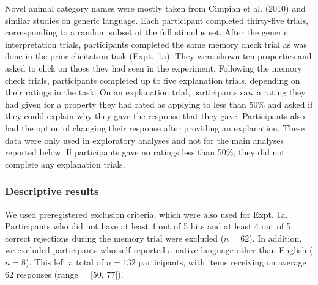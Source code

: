 \documentclass[floatsintext,man]{apa6}
\begin{document}
Novel animal category names were mostly taken from Cimpian et al. (2010) and similar studies on generic language.
Each participant completed thirty-five trials, corresponding to a random subset of the full stimulus set.
After the generic interpretation trials, participants completed the same memory check trial as was done in the prior elicitation task (Expt.~1a).
They were shown ten properties and asked to click on those they had seen in the experiment.
Following the memory check trials, participants completed up to five explanation trials, depending on their ratings in the task.
On an explanation trial, participants saw a rating they had given for a property they had rated as applying to less than 50\% and asked if they could explain why they gave the response that they gave.
Participants also had the option of changing their response after providing an explanation.
These data were only used in exploratory analyses and not for the main analyses reported below.
If participants gave no ratings less than 50\%, they did not complete any explanation trials.

\hypertarget{descriptive-results}{%
\subsubsection{Descriptive results}\label{descriptive-results}}

We used preregistered exclusion criteria, which were also used for Expt. 1a.
Participants who did not have at least 4 out of 5 hits and at least 4 out of 5 correct rejections during the memory trial were excluded (\(n = 62\)).
In addition, we excluded participants who self-reported a native language other than English (\(n = 8\)).
This left a total of \(n = 132\) participants, with items receiving on average 62 responses (range = {[}50, 77{]}).
\end{document}
